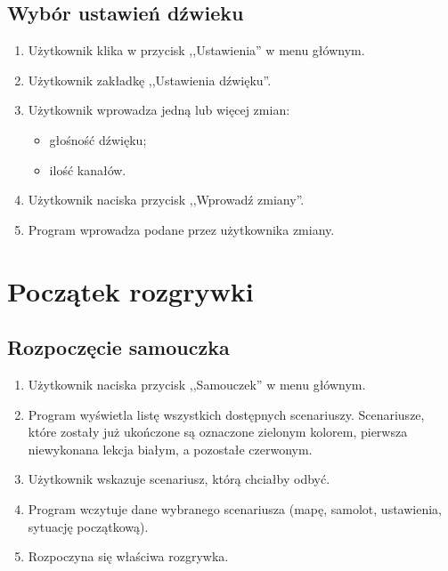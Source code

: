 \documentclass{mwrep}
\begin{document}
\section{Wybór ustawień dźwieku}
\begin{enumerate}
  \item Użytkownik klika w przycisk ,,Ustawienia'' w menu głównym.
  \item Użytkownik zakładkę ,,Ustawienia dźwięku''.
  \item Użytkownik wprowadza jedną lub więcej zmian:
  \begin{itemize}
    \item głośność dźwięku;
    \item ilość kanałów.
  \end{itemize}
  \item Użytkownik naciska przycisk ,,Wprowadź zmiany''.
  \item Program wprowadza podane przez użytkownika zmiany.
\end{enumerate}

\chapter{Początek rozgrywki}
\section{Rozpoczęcie samouczka}
\begin{enumerate}
  \item Użytkownik naciska przycisk ,,Samouczek'' w menu głównym.
  \item Program wyświetla listę wszystkich dostępnych scenariuszy. Scenariusze, które zostały już ukończone są oznaczone zielonym kolorem, pierwsza niewykonana lekcja białym, a pozostałe czerwonym.
  \item Użytkownik wskazuje scenariusz, którą chciałby odbyć.
  \item Program wczytuje dane wybranego scenariusza (mapę, samolot, ustawienia, sytuację początkową).
  \item Rozpoczyna się właściwa rozgrywka.
\end{enumerate}
\end{document}
